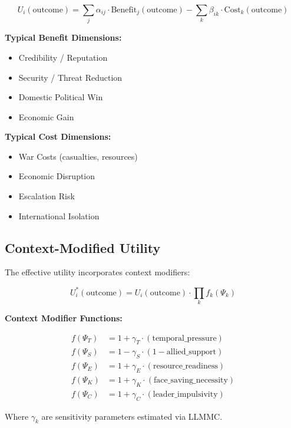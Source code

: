 \begin{equation}
U_i(\text{outcome}) = \sum_j \alpha_{ij} \cdot \text{Benefit}_j(\text{outcome}) - \sum_k \beta_{ik} \cdot \text{Cost}_k(\text{outcome})
\end{equation}

\textbf{Typical Benefit Dimensions:}
\begin{itemize}
\item Credibility / Reputation
\item Security / Threat Reduction
\item Domestic Political Win
\item Economic Gain
\end{itemize}

\textbf{Typical Cost Dimensions:}
\begin{itemize}
\item War Costs (casualties, resources)
\item Economic Disruption
\item Escalation Risk
\item International Isolation
\end{itemize}

\subsection{Context-Modified Utility}

The effective utility incorporates context modifiers:

\begin{equation}
U^*_i(\text{outcome}) = U_i(\text{outcome}) \cdot \prod_k f_k(\Psi_k)
\end{equation}

\textbf{Context Modifier Functions:}

\begin{align}
f(\Psi_T) &= 1 + \gamma_T \cdot (\text{temporal\_pressure}) \\
f(\Psi_S) &= 1 - \gamma_S \cdot (1 - \text{allied\_support}) \\
f(\Psi_E) &= 1 + \gamma_E \cdot (\text{resource\_readiness}) \\
f(\Psi_K) &= 1 + \gamma_K \cdot (\text{face\_saving\_necessity}) \\
f(\Psi_C) &= 1 + \gamma_C \cdot (\text{leader\_impulsivity})
\end{align}

Where $\gamma_k$ are sensitivity parameters estimated via LLMMC.



